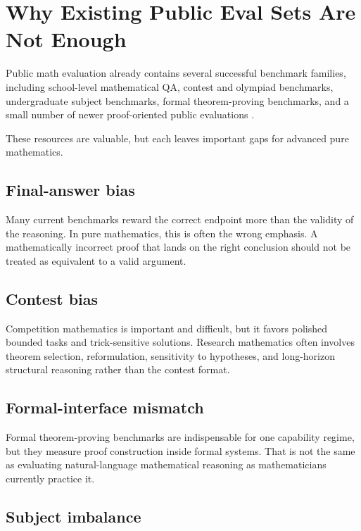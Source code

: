 \documentclass[11pt]{article}
\begin{document}
\section{Why Existing Public Eval Sets Are Not Enough}

Public math evaluation already contains several successful benchmark families, including school-level mathematical QA, contest and olympiad benchmarks, undergraduate subject benchmarks, formal theorem-proving benchmarks, and a small number of newer proof-oriented public evaluations \cite{cobbe2021gsm8k,hendrycks2021measuring,he2024olympiadbench,wang2024omnimath,zheng2025ugmathbench,polu2021formalmath}.

These resources are valuable, but each leaves important gaps for advanced pure mathematics.

\subsection{Final-answer bias}

Many current benchmarks reward the correct endpoint more than the validity of the reasoning. In pure mathematics, this is often the wrong emphasis. A mathematically incorrect proof that lands on the right conclusion should not be treated as equivalent to a valid argument.

\subsection{Contest bias}

Competition mathematics is important and difficult, but it favors polished bounded tasks and trick-sensitive solutions. Research mathematics often involves theorem selection, reformulation, sensitivity to hypotheses, and long-horizon structural reasoning rather than the contest format.

\subsection{Formal-interface mismatch}

Formal theorem-proving benchmarks are indispensable for one capability regime, but they measure proof construction inside formal systems. That is not the same as evaluating natural-language mathematical reasoning as mathematicians currently practice it.

\subsection{Subject imbalance}
\end{document}
